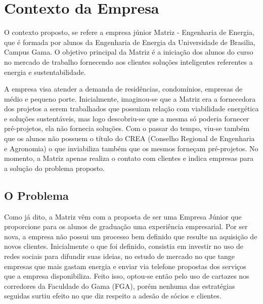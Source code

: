 \chapter[Contexto da Empresa]{Contexto da Empresa}
O contexto proposto, se refere a empresa júnior Matriz - Engenharia de Energia, que é 
formada por alunos da Engenharia de Energia da Universidade de Brasilia, Campus Gama. 
O objetivo principal da Matriz é a iniciação dos alunos do curso no mercado de trabalho 
fornecendo aos clientes soluções inteligentes referentes a energia e sustentabilidade.

A empresa visa atender a demanda de residências, condomínios, empresas de médio 
e pequeno porte. Inicialmente, imaginou-se que a Matriz era a fornecedora dos projetos a 
serem trabalhados que possuiam relação com viabilidade energética e soluções sustentáveis,
mas logo descobriu-se que a mesma só poderia fornecer pré-projetos, ela não fornecia 
soluções. Com o passar do tempo, viu-se também que os alunos não possuem o título do CREA 
(Conselho Regional de Engenharia e Agronomia) o que inviabiliza também que os mesmos forneçam 
pré-projetos. No momento, a Matriz apenas realiza o contato com clientes e indica empresas 
para a solução do problema proposto.

\section{O Problema}
Como já dito, a Matriz vêm com a proposta de ser uma Empresa Júnior que proporcione para 
os alunos de graduação uma experiência empresarial. Por ser nova, a empresa não possui 
um processo bem definido que resulte na aquisição de novos clientes. Inicialmente o que 
foi definido, consistia em investir no uso de redes sociais para difundir suas ideias, 
no estudo de mercado no que tange empresas que mais gastam energia e enviar via telefone
propostas dos serviços que a empresa disponibiliza. Feito isso, optou-se então pelo uso de
cartazes nos corredores da Faculdade do Gama (FGA), porém nenhuma das estratégias seguidas
surtiu efeito no que diz respeito a adesão de sócios e clientes.

